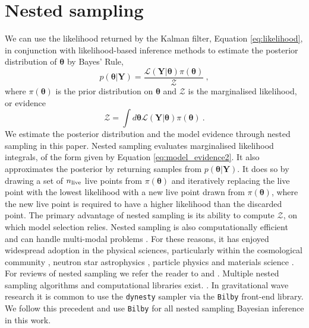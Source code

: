\documentclass[fleqn,usenatbib,useAMS]{mnras}
\begin{document}
\section{Nested sampling}\label{sec:nested_sampling}
We can use the likelihood returned by the Kalman filter, Equation \eqref{eq:likelihood}, in conjunction with likelihood-based inference methods to estimate the posterior distribution of $\boldsymbol{\theta}$ by Bayes' Rule,
\begin{equation}
	p(\boldsymbol{\theta} | \boldsymbol{Y}) = \frac{\mathcal{L}(\boldsymbol{Y} | \boldsymbol{\theta}) \pi(\boldsymbol{\theta})}{\mathcal{Z}} \ ,
\end{equation}
where $\pi(\boldsymbol{\theta})$ is the prior distribution on $\boldsymbol{\theta}$ and $\mathcal{Z}$ is the marginalised likelihood, or evidence
\begin{equation}
	\mathcal{Z} = \int d \boldsymbol{\theta} \mathcal{L}(\boldsymbol{Y} | \boldsymbol{\theta})  \pi(\boldsymbol{\theta})  \ . \label{eq:model_evidence2}
\end{equation}
We estimate the posterior distribution and the model evidence through nested sampling \citep{Skilling} in this paper. Nested sampling evaluates marginalised likelihood integrals, of the form given by Equation \eqref{eq:model_evidence2}. It also approximates the posterior by returning samples from $p(\boldsymbol{\theta} | \boldsymbol{Y})$. It does so by drawing a set of $n_{\rm live}$ live points from $\pi(\boldsymbol{\theta})$ and iteratively replacing the live point with the lowest likelihood with a new live point drawn from $\pi(\boldsymbol{\theta})$, where the new live point is required to have a higher likelihood than the discarded point. The primary advantage of nested sampling is its ability to compute $\mathcal{Z}$, on which model selection relies. Nested sampling is also computationally efficient and can handle multi-modal problems \citep{Ashton2022}. For these reasons, it has enjoyed widespread adoption in the physical sciences, particularly within the cosmological community \citep{Mukherjee2006,Feroz2008,Handley2015}, neutron star astrophysics \citep{Myers2021MNRAS.502.3113M,Meyers2021,Melatos2023}, particle physics \citep{proceedings2019033014} and materials science \citep{2009arXiv0906materials}. For reviews of nested sampling we refer the reader to \cite{Buchner2021} and \cite{Ashton2022}. Multiple nested sampling algorithms and computational libraries exist. \citep[e.g.][]{Feroz2008,Feroz2009,Handley2015,dynesty2020,UltraNest2021}. In gravitational wave research it is common to use the \texttt{dynesty} sampler \citep{dynesty2020} via the \texttt{Bilby} \citep{bilby.507.2037A} front-end library. We follow this precedent and use \texttt{Bilby} for all nested sampling Bayesian inference in this work. \newline 
\end{document}
